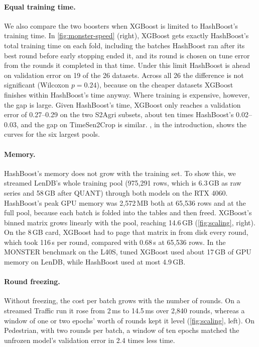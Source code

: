 \documentclass[a4paper, 11pt]{article}
\begin{document}
\paragraph{Equal training time.}
We also compare the two boosters when XGBoost is limited to HashBoost's
training time. In \cref{fig:monster-speed} (right), XGBoost gets exactly
HashBoost's total training time on each fold, including the batches
HashBoost ran after its best round before early stopping ended it, and its
round is chosen on tune error from the rounds it completed in that time.
Under this limit HashBoost
is ahead on validation error on 19 of the 26 datasets. Across all 26 the
difference is not significant (Wilcoxon $p = 0.24$), because on the cheaper
datasets XGBoost finishes within HashBoost's time anyway. Where training is
expensive, however, the gap is large. Given HashBoost's time, XGBoost only
reaches a validation error of 0.27--0.29 on the two S2Agri subsets, about ten
times HashBoost's 0.02--0.03, and the gap on TimeSen2Crop is similar. , in the
introduction, shows the curves for the six largest pools.

\paragraph{Memory.}
\label{sec:memory}
HashBoost's memory does not grow with the training set. To show this, we
streamed LenDB's whole training pool (975,291 rows, which is 6.3\,GB as
raw series and 58\,GB after QUANT) through both models on the RTX 4060.
HashBoost's peak GPU memory was 2,572\,MB both at 65,536 rows and at the full
pool, because each batch is folded into the tables and then freed. XGBoost's
binned matrix grows linearly with the pool, reaching 14.6\,GB
(\cref{fig:scaling}, right). On the 8\,GB card, XGBoost had to page that
matrix in from disk every round, which took 116\,s per round, compared with
0.68\,s at 65,536 rows. In the MONSTER benchmark on the L40S, tuned XGBoost
used about 17\,GB of GPU memory on LenDB, while HashBoost used at most
4.9\,GB.

\paragraph{Round freezing.}
Without freezing, the cost per batch grows with the number of rounds. On a
streamed Traffic run it rose from 2\,ms to 14.5\,ms over 2,840 rounds,
whereas a window of one or two epochs' worth of rounds kept it level
(\cref{fig:scaling}, left). On Pedestrian, with two rounds per batch, a
window of ten epochs matched the unfrozen model's validation error in 2.4
times less time.
\end{document}
